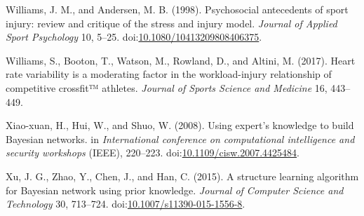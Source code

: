 \documentclass[
  english,
  man]{apa6}
\newlength{\cslhangindent}
\newenvironment{cslreferences}%
  {\setlength{\parindent}{0pt}%
  \everypar{\setlength{\hangindent}{\cslhangindent}}\ignorespaces}%
  {\par}
\begin{document}
\begin{cslreferences}
\leavevmode\hypertarget{ref-Williams1998}{}%
Williams, J. M., and Andersen, M. B. (1998). Psychosocial antecedents of sport injury: review and critique of the stress and injury model. \emph{Journal of Applied Sport Psychology} 10, 5--25. doi:\href{https://doi.org/10.1080/10413209808406375}{10.1080/10413209808406375}.

\leavevmode\hypertarget{ref-Williams2017}{}%
Williams, S., Booton, T., Watson, M., Rowland, D., and Altini, M. (2017). Heart rate variability is a moderating factor in the workload-injury relationship of competitive crossfit™ athletes. \emph{Journal of Sports Science and Medicine} 16, 443--449.

\leavevmode\hypertarget{ref-Xiao-xuan2007}{}%
Xiao-xuan, H., Hui, W., and Shuo, W. (2008). Using expert's knowledge to build Bayesian networks. in \emph{International conference on computational intelligence and security workshops} (IEEE), 220--223. doi:\href{https://doi.org/10.1109/cisw.2007.4425484}{10.1109/cisw.2007.4425484}.

\leavevmode\hypertarget{ref-Xu2015}{}%
Xu, J. G., Zhao, Y., Chen, J., and Han, C. (2015). A structure learning algorithm for Bayesian network using prior knowledge. \emph{Journal of Computer Science and Technology} 30, 713--724. doi:\href{https://doi.org/10.1007/s11390-015-1556-8}{10.1007/s11390-015-1556-8}.
\end{cslreferences}

\endgroup
\end{document}
